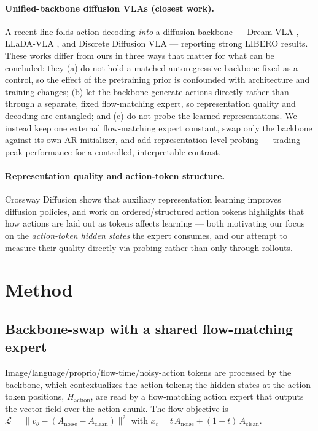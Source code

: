 \documentclass[conference]{IEEEtran}
\begin{document}
\paragraph{Unified-backbone diffusion VLAs (closest work).} A recent line folds
action decoding \emph{into} a diffusion backbone --- Dream-VLA \cite{dreamvla},
LLaDA-VLA \cite{lladavla}, and Discrete Diffusion VLA \cite{discretediffvla} ---
reporting strong LIBERO results. These works differ from ours in three ways that
matter for what can be concluded: they (a) do not hold a matched autoregressive
backbone fixed as a control, so the effect of the pretraining prior is
confounded with architecture and training changes; (b) let the backbone generate
actions directly rather than through a separate, fixed flow-matching expert, so
representation quality and decoding are entangled; and (c) do not probe the
learned representations. We instead keep one external flow-matching expert
constant, swap only the backbone against its own AR initializer, and add
representation-level probing --- trading peak performance for a controlled,
interpretable contrast.

\paragraph{Representation quality and action-token structure.} Crossway Diffusion
\cite{crossway} shows that auxiliary representation learning improves diffusion
policies, and work on ordered/structured action tokens \cite{oat} highlights that
how actions are laid out as tokens affects learning --- both motivating our focus
on the \emph{action-token hidden states} the expert consumes, and our attempt to
measure their quality directly via probing rather than only through rollouts.

\section{Method}
\subsection{Backbone-swap with a shared flow-matching expert}
Image/language/proprio/flow-time/noisy-action tokens are processed by the
backbone, which contextualizes the action tokens; the hidden states at the
action-token positions, $H_{\text{action}}$, are read by a flow-matching action
expert that outputs the vector field over the action chunk. The flow objective
is $\mathcal{L}=\lVert v_\theta - (A_{\text{noise}}-A_{\text{clean}})\rVert^2$
with $x_t = t\,A_{\text{noise}} + (1-t)\,A_{\text{clean}}$.
\end{document}
